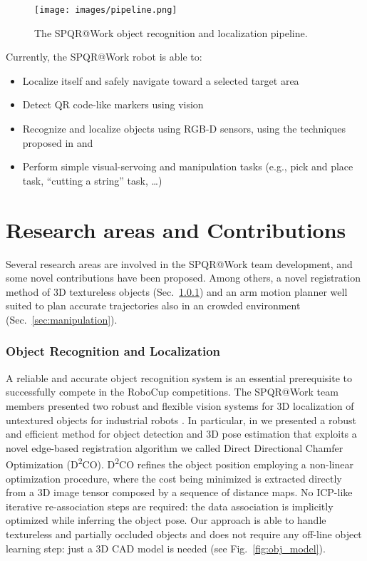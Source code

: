 \documentclass{llncs}
\begin{document}
\begin{figure}[t!]
\begin{center}
\texttt{[image: images/pipeline.png]}
\end{center}
\caption{The SPQR@Work object recognition and localization pipeline.}\label{fig:pipeline}
\end{figure}

Currently, the SPQR@Work robot is able to:

\begin{itemize}
 \item Localize itself and safely navigate toward a selected target area
 \item Detect QR code-like markers using vision
 \item Recognize and localize objects using RGB-D sensors, using the techniques proposed in \cite{miap_icvs2015} and \cite{prettoCASE2013}
 \item Perform simple visual-servoing and manipulation tasks (e.g., pick and place task, ``cutting a string'' task, \dots)
\end{itemize}
 
\section{Research areas and Contributions}\label{sec:research}

Several research areas are involved in the SPQR@Work team development, and some novel contributions have been proposed. Among others, a novel registration method of 3D textureless objects (Sec.~\ref{sec:object_rec}) and an arm motion planner well suited to plan
accurate trajectories also in an crowded environment (Sec.~\ref{sec:manipulation}).


\subsubsection{Object Recognition and Localization}\label{sec:object_rec}

A reliable and accurate object recognition system is an essential prerequisite to successfully compete in the RoboCup competitions. The SPQR@Work team members presented two robust and flexible vision systems for 3D localization of untextured objects for industrial robots \cite{miap_icvs2015,prettoCASE2013}. In particular, in \cite{miap_icvs2015} we presented a robust and efficient method for object detection and 3D pose estimation that exploits a novel edge-based registration algorithm we called Direct Directional Chamfer Optimization (D\textsuperscript{2}CO). D\textsuperscript{2}CO refines the object position employing a non-linear optimization procedure, where the cost being minimized is extracted directly from a 3D image tensor composed by a sequence of distance maps. No ICP-like iterative re-association steps are required: the data association is implicitly optimized while inferring the object pose. Our approach is able to handle textureless and partially occluded objects and does not require any off-line object learning step: just a 3D CAD model is needed (see Fig.~\ref{fig:obj_model}).
\end{document}
